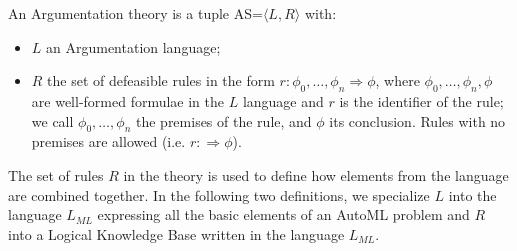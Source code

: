 \begin{definition}\label{system}
An Argumentation theory is a tuple AS=$\langle L, R \rangle$ with:
\begin{itemize}
    \item $L$ an Argumentation language;
    \item $R$ the set of defeasible rules in the form $r : \phi_0,\ldots, \phi_n \Rightarrow \phi$, where $\phi_0,\ldots, \phi_n,\phi$ are well-formed formulae in the $L$ language and $r$ is the identifier of the rule; we call $\phi_0,\ldots, \phi_n$ the premises of the rule, and $\phi$ its conclusion.
    Rules with no premises are allowed (i.e. $r : \Rightarrow \phi$).
\end{itemize}
\end{definition}

The set of rules $R$ in the theory is used to define how elements from the language are combined together.
In the following two definitions, we specialize $L$ into the language $L_{ML}$ expressing all the basic elements of an AutoML problem and $R$ into a Logical Knowledge Base written in the language $L_{ML}$.

